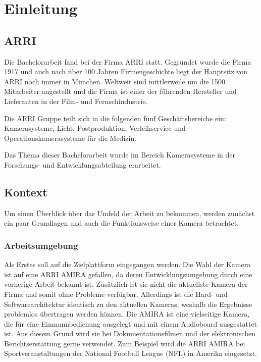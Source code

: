 \chapter{Einleitung}

\section{\acl{ARRI}}
Die Bachelorarbeit fand bei der Firma \ac{ARRI} statt. Gegründet wurde die Firma 1917 und auch nach über 100 Jahren Firmengeschichte liegt der Hauptsitz von \ac{ARRI} noch immer in München. 
Weltweit sind mittlerweile um die 1500 Mitarbeiter angestellt und die Firma ist einer der führenden Hersteller und Lieferanten in der Film- und Fernsehindustrie.

Die \ac{ARRI} Gruppe teilt sich in die folgenden fünf Geschäftsbereiche ein: Kamerasysteme, Licht, Postproduktion, Verleihservice und Operationskamerasysteme für die Medizin. \cite{arricorpinfo}

Das Thema dieser Bachelorarbeit wurde im Bereich Kamerasysteme in der Forschungs- und Entwicklungsabteilung erarbeitet.

\section{Kontext}
Um einen Überblick über das Umfeld der Arbeit zu bekommen, werden zunächst ein paar Grundlagen und auch die Funktionsweise einer Kamera betrachtet.


\subsection{Arbeitsumgebung}
Als Erstes soll auf die Zielplattform eingegangen werden. Die Wahl der Kamera ist auf eine \ac{ARRI} AMIRA gefallen, da deren Entwicklungsumgebung durch eine vorherige Arbeit bekannt ist. Zusätzlich ist sie nicht die aktuellste Kamera der Firma und somit ohne Probleme verfügbar. Allerdings ist die Hard- und Softwarearchitektur identisch zu den aktuellen Kameras, weshalb die Ergebnisse problemlos übertragen werden können.
Die AMIRA ist eine vielseitige Kamera, die für eine Einmannbedienung ausgelegt und mit einem Audioboard ausgestattet ist. Aus diesem Grund wird sie bei Dokumentationsfilmen und der elektronischen Berichtserstattung gerne verwendet. Zum Beispiel wird die \ac{ARRI} AMIRA bei Sportveranstaltungen der National Football League (NFL) in Amerika eingesetzt.\cite{arrinewsamira} 

